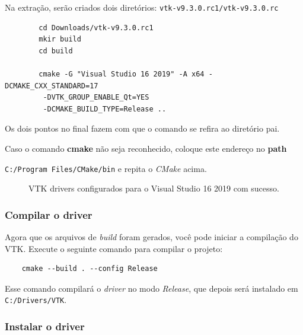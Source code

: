 \documentclass[a4paper,11pt]{article}
\newcommand{\cmake}{\textit{CMake}}
\begin{document}
Na extração, serão criados dois diretórios: {\tt vtk-v9.3.0.rc1/vtk-v9.3.0.rc}

\begin{mdframed}
	\begin{verbatim}
		cd Downloads/vtk-v9.3.0.rc1
		mkir build
		cd build
		
		cmake -G "Visual Studio 16 2019" -A x64 -DCMAKE_CXX_STANDARD=17
		 -DVTK_GROUP_ENABLE_Qt=YES
		 -DCMAKE_BUILD_TYPE=Release ..
	\end{verbatim}
\end{mdframed}

Os dois pontos no final fazem com que o comando se refira ao diretório pai.

Caso o comando \textbf{cmake} não seja reconhecido, coloque este endereço no \textbf{path}

{\tt C:/Program Files/CMake/bin} e repita o \cmake{} acima.

\begin{figure}[H]
	\centering
	\caption{VTK drivers configurados para o Visual Studio 16 2019 com sucesso.}
	\label{fig:vtk_build}
\end{figure}

\subsubsection{Compilar o driver}

Agora que os arquivos de \textit{build} foram gerados, você pode iniciar a compilação do VTK. Execute o seguinte comando para compilar o projeto:
\begin{mdframed}
	\begin{verbatim}
	cmake --build . --config Release 
	\end{verbatim}
\end{mdframed}

Esse comando compilará o \textit{driver} no modo \textit{Release}, que depois será instalado em {\tt C:/Drivers/VTK}.

\subsubsection{Instalar o driver}
\end{document}

